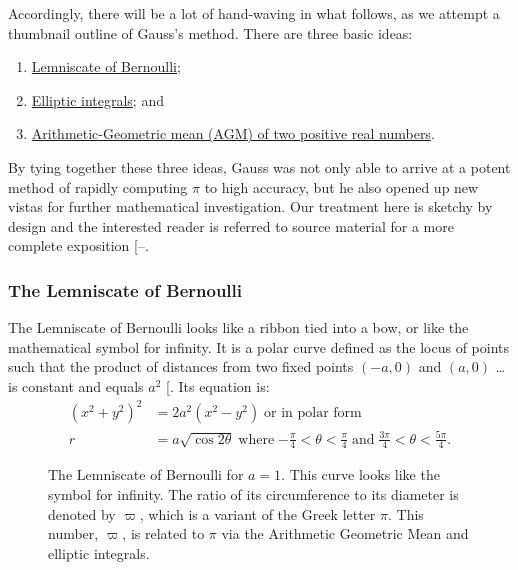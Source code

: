 \documentclass[
  a4paper,
]{article}
\begin{document}
Accordingly, there will be a lot of hand-waving in what follows, as we
attempt a thumbnail outline of Gauss's method. There are three basic
ideas:

\begin{enumerate}
\def\labelenumi{(\alph{enumi})}
\item
  \href{https://mathworld.wolfram.com/Lemniscate.html}{Lemniscate of
  Bernoulli};
\item
  \href{https://en.wikipedia.org/wiki/Elliptic_integral}{Elliptic
  integrals}; and
\item
  \href{https://en.wikipedia.org/wiki/Arithmetic\%E2\%80\%93geometric_mean}{Arithmetic-Geometric
  mean (AGM) of two positive real numbers}.
\end{enumerate}

By tying together these three ideas, Gauss was not only able to arrive
at a potent method of rapidly computing \(\pi\) to high accuracy, but he
also opened up new vistas for further mathematical investigation. Our
treatment here is sketchy by design and the interested reader is
referred to source material for a more complete exposition
{[}--\citeproc{ref-langton-2001}{34}{]}.

\subsubsection{The Lemniscate of
Bernoulli}\label{the-lemniscate-of-bernoulli}

The Lemniscate of Bernoulli looks like a ribbon tied into a bow, or like
the mathematical symbol for infinity. It is a polar curve defined as the
locus of points such that the product of distances from two fixed points
\((-a, 0)\) and \((a, 0)\) \ldots is constant and equals \(a^2\)
{[}\citeproc{ref-lemniscate-mathworld}{35}{]}. Its equation is: \[
\begin{aligned}
(x^2 + y^2)^2 &= 2a^2(x^2 - y^2)\; \text{or in polar form}\\
r &= a\sqrt{\cos2\theta} \; \text{where}\; \textstyle{-\frac{\pi}{4} < \theta < \frac{\pi}{4}\; \text{and}\; \frac{3\pi}{4} < \theta < \frac{5\pi}{4}}.
\end{aligned}
\]

\begin{figure}
\centering

\caption{The Lemniscate of Bernoulli for \(a = 1\). This curve looks
like the symbol for infinity. The ratio of its circumference to its
diameter is denoted by \(\varpi\), which is a variant of the Greek
letter \(\pi\). This number, \(\varpi\), is related to \(\pi\) via the
Arithmetic Geometric Mean and elliptic integrals.}\label{fig:lemniscate}
\end{figure}
\end{document}
